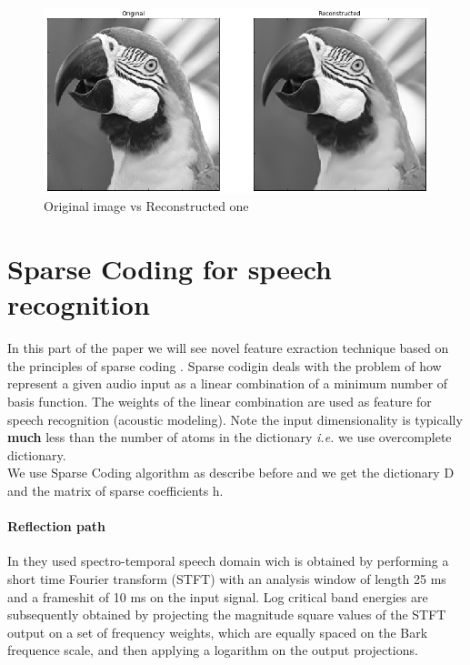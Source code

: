 \documentclass[a4paper,10pt]{article}
\begin{document}
\begin{figure}[h]
 \centering
 \includegraphics[scale=0.4]{Results/SPORCO_test_img/recons.png}
 \caption{Original image vs Reconstructed one}
\end{figure}

\newpage
\section{Sparse Coding for speech recognition}
In this part of the paper we will see novel feature exraction technique based on the principles of sparse coding \cite{DL_speech_reco}. Sparse codigin deals with the problem of how represent a given audio input as a linear combination of a minimum number of basis function. The weights of the linear combination are used as feature for speech recognition (acoustic modeling). Note the input dimensionality is typically \textbf{much} less than the number of atoms in the dictionary \textit{i.e.} we use overcomplete dictionary.\\
We use Sparse Coding algorithm as describe before and we get the dictionary D and  the matrix of sparse coefficients  h.\\
\paragraph{Reflection path} In \cite{DL_speech_reco} they used spectro-temporal speech domain wich is obtained by performing a short time Fourier transform (STFT) with an analysis window of length 25 ms and a frameshit of 10 ms on the input signal. Log critical band energies are subsequently obtained by projecting the magnitude square values of the STFT output on a set of frequency weights, which are equally spaced on the Bark frequence scale, and then applying a logarithm on the output projections.
\newpage


\end{document}
